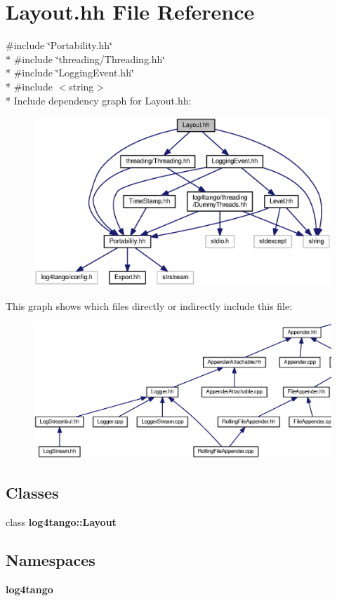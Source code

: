 \section{Layout.\-hh File Reference}
\label{Layout_8hh}
{\ttfamily \#include \char`\"{}Portability.\-hh\char`\"{}}\\*
{\ttfamily \#include \char`\"{}threading/\-Threading.\-hh\char`\"{}}\\*
{\ttfamily \#include \char`\"{}Logging\-Event.\-hh\char`\"{}}\\*
{\ttfamily \#include $<$string$>$}\\*
Include dependency graph for Layout.\-hh\-:
\nopagebreak
\begin{figure}[H]
\begin{center}
\leavevmode
\includegraphics[width=350pt]{d7/dbd/Layout_8hh__incl}
\end{center}
\end{figure}
This graph shows which files directly or indirectly include this file\-:
\nopagebreak
\begin{figure}[H]
\begin{center}
\leavevmode
\includegraphics[width=350pt]{d3/d14/Layout_8hh__dep__incl}
\end{center}
\end{figure}
\subsection*{Classes}
\begin{DoxyCompactItemize}
\item 
class {\bf log4tango\-::\-Layout}
\end{DoxyCompactItemize}
\subsection*{Namespaces}
\begin{DoxyCompactItemize}
\item 
{\bf log4tango}
\end{DoxyCompactItemize}
